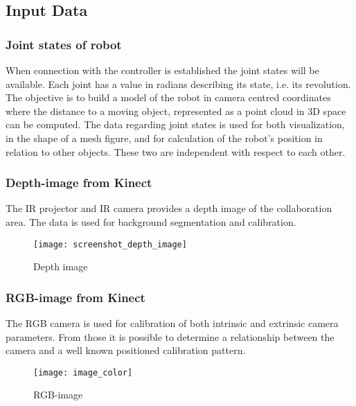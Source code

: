 \subsection{Input Data}
\subsubsection{Joint states of robot}
When connection with the controller is established the joint states will be available. Each joint has a value in radians describing its state, i.e. its revolution. The objective is to build a model of the robot in camera centred coordinates where the distance to a moving object, represented as a point cloud in 3D space can be computed.
The data regarding joint states is used for both visualization, in the shape of a mesh figure, and for calculation of the robot's position in relation to other objects. These two are independent with respect to each other.

\subsubsection{Depth-image from Kinect}
The IR projector and IR camera provides a depth image of the collaboration area. The data is used for background segmentation and calibration. 

\begin{figure}[H]
\begin{center}
\texttt{[image: screenshot\_depth\_image]}
\caption{Depth image}

\end{center}
\end{figure}

\subsubsection{RGB-image from Kinect}
The RGB camera is used for calibration of both intrinsic and extrinsic camera parameters. From those it is possible to determine a relationship between the camera and a well known positioned calibration pattern. 

\begin{figure}[H]
\begin{center}
\texttt{[image: image\_color]}
\caption{RGB-image}

\end{center}
\end{figure}
